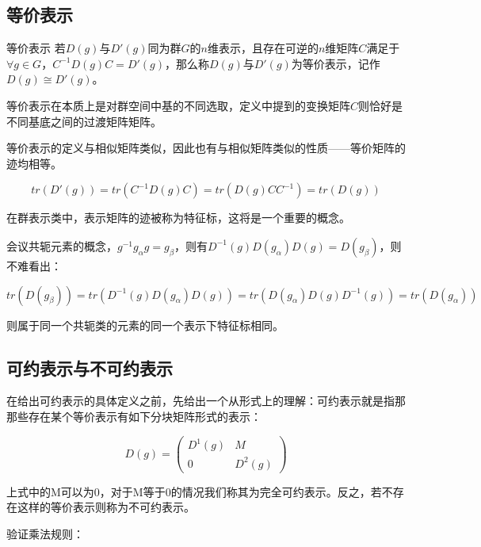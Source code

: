 
\begin{issues}
\issueDraft
\issueMissDepend
\end{issues}

\subsection{等价表示}
\begin{definition}{等价表示}
若$D(g)$与$D'(g)$同为群$G$的$n$维表示，且存在可逆的$n$维矩阵$C$满足于$\forall g\in G$，$C^{-1}D(g)C=D'(g)$，那么称$D(g)$与$D'(g)$为等价表示，记作$D(g)\cong D'(g)$。
\end{definition}

等价表示在本质上是对群空间中基的不同选取，定义中提到的变换矩阵$C$则恰好是不同基底之间的过渡矩阵矩阵。

等价表示的定义与相似矩阵类似，因此也有与相似矩阵类似的性质——等价矩阵的迹均相等。

$$tr(D'(g))=tr(C^{-1}D(g)C)=tr(D(g)CC^{-1})=tr(D(g))$$

在群表示类中，表示矩阵的迹被称为特征标，这将是一个重要的概念。

会议共轭元素的概念，$g^{-1}g_\alpha g=g_\beta$，则有$D^{-1}(g)D(g_\alpha)D(g)=D(g_\beta)$，则不难看出：

$$tr(D(g_\beta))=tr(D^{-1}(g)D(g_\alpha)D(g))=tr(D(g_\alpha)D(g)D^{-1}(g))=tr(D(g_\alpha))$$

则属于同一个共轭类的元素的同一个表示下特征标相同。


\subsection{可约表示与不可约表示}

在给出可约表示的具体定义之前，先给出一个从形式上的理解：可约表示就是指那那些存在某个等价表示有如下分块矩阵形式的表示：

\begin{equation}
D(g)=\begin{pmatrix}
 D^1(g) & M\\
 0 & D^2(g)
\end{pmatrix}
\end{equation}

上式中的M可以为0，对于M等于0的情况我们称其为完全可约表示。反之，若不存在这样的等价表示则称为不可约表示。

验证乘法规则：

